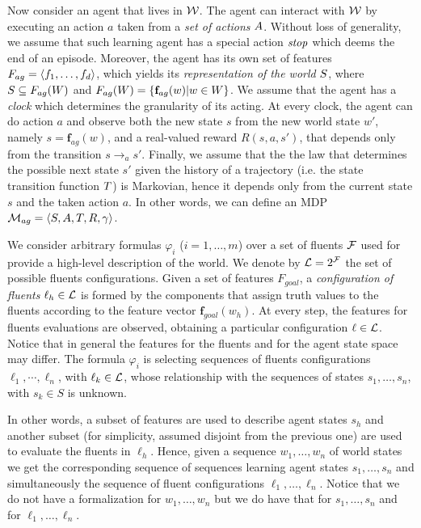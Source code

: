 Now consider an agent that lives in $\mathcal{W}$. The agent can interact with $\mathcal{W}$ by executing an action $a$ taken from a \emph{set of actions} $A$. Without loss of generality, we assume that such learning agent has a special action $\mathit{stop}$ which deems the end of an episode.
Moreover, the agent has its own set of features $F_{ag} = \langle f_1, \dots, f_d \rangle$, which yields its \emph{representation of the world} $S$, where $S \subseteq F_{ag}(W)$ and $F_{ag}(W) = \{\mathbf{f}_{ag}(w) | w \in W\}$. We assume that the agent has a \emph{clock} which determines the granularity of its acting. At every clock, the agent can do action $a$ and observe both the new state $s$ from the new world state $w'$, namely $s = \mathbf{f}_{ag}(w)$, and a real-valued reward $R(s,a,s')$, that depends only from the transition $s\to_a s'$.
Finally, we assume that the the law that determines the possible next state $s'$ given the history of a trajectory (i.e. the state transition function $T$) is Markovian, hence it depends only from the current state $s$ and the taken action $a$. 
In other words, we can define an MDP $\mathcal{M}_{ag} = \langle S, A, T, R, \gamma \rangle$.

We consider arbitrary \LLf formulas $\varphi_i$
($i=1,\ldots,m$) over a set of fluents $\mathcal{F}$ used for provide a high-level description of the world. We denote by $\mathcal{L}=2^{\mathcal{F}}$ the set of possible fluents configurations. 
Given a set of features $F_{goal}$, a \emph{configuration of fluents} $\ell_h \in \mathcal{L}$ is formed by the components that assign truth values to the fluents according to
the feature vector $\mathbf{f}_{goal}(w_h)$. At every step, the features for fluents evaluations are observed, obtaining a particular configuration $\ell\in\mathcal{L}$. Notice that in general the features for the fluents and for the agent state space may differ. The formula $\varphi_i$ is
selecting sequences of fluents configurations $\ell_1,\cdots,\ell_n$,
with $\ell_k\in \mathcal{L}$, whose relationship with the sequences of states
$s_1,\ldots, s_n$, with $s_k \in S$ is unknown.

 In other words, a subset of features are used to describe agent states $s_h$ and another  subset (for simplicity, assumed disjoint from the previous one) are used to evaluate the fluents in $\ell_h$.
 Hence, given a sequence $w_1,\ldots,w_n$ of
 world states we get the corresponding sequence of sequences learning
 agent states $s_1,\ldots,s_n$ and simultaneously the sequence of fluent
 configurations $\ell_1,\ldots,\ell_n$.  Notice that we do not have a
 formalization for $w_1,\ldots,w_n$ but we do have that for $s_1,\ldots,s_n$
 and for $\ell_1,\ldots,\ell_n$. 


